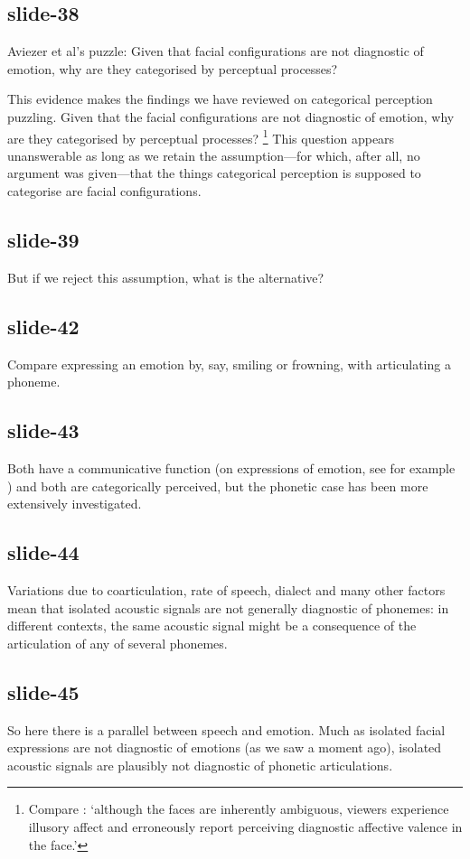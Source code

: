 \documentclass[12pt,\papersize]{extarticle}
\begin{document}
\subsection{slide-38}
Aviezer et al's puzzle:
Given that  facial configurations are not diagnostic of emotion, why  are they categorised by perceptual processes?

This evidence makes the findings we have reviewed on categorical perception puzzling.
Given that the facial configurations are not diagnostic of emotion,
why are they categorised by perceptual processes?%
\footnote{
Compare \citet[p.\ 1228]{aviezer:2012_body}:
`although the faces are inherently ambiguous, viewers experience illusory affect and erroneously
report perceiving diagnostic affective valence in the face.'
}
This question appears unanswerable as long as we retain the assumption---for which, after all, no
argument was given---that the things categorical perception is supposed to categorise are facial
configurations.

\subsection{slide-39}
But if we reject this assumption, what is the alternative?

\subsection{slide-42}
Compare expressing an emotion by, say, smiling or frowning,  with articulating a phoneme.

\subsection{slide-43}
Both have a communicative function (on expressions of emotion, see for example \citealp{blair:2003_facial,sato:2007_spontaneous})
and both are categorically perceived,
but the phonetic case has been more extensively investigated.

\subsection{slide-44}
Variations due to coarticulation, rate of speech, dialect and many other factors mean that isolated acoustic signals are not generally diagnostic of phonemes:
in different contexts, the same acoustic signal might be a consequence of the articulation of any of several phonemes.

\subsection{slide-45}
So here there is a parallel between speech and emotion.
Much as isolated facial expressions are not diagnostic of emotions (as we saw a moment ago), isolated acoustic signals are plausibly not diagnostic of phonetic articulations.
\end{document}
